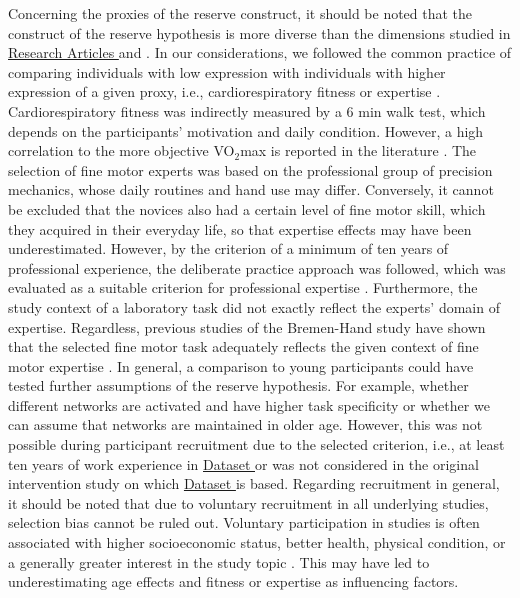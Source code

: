 Concerning the proxies of the reserve construct, it should be noted that the construct of the reserve hypothesis is more diverse than the dimensions studied in \hyperref[results:paperI]{Research Articles } and \hyperref[results:paperI]{}. In our considerations, we followed the common practice of comparing individuals with low expression with individuals with higher expression of a given proxy, i.e., cardiorespiratory fitness or expertise \cite{Koen2019}. Cardiorespiratory fitness was indirectly measured by a 6 min walk test, which depends on the participants' motivation and daily condition. However, a high correlation to the more objective VO$_2$max is reported in the literature \cite{Zhang2017}. The selection of fine motor experts was based on the professional group of precision mechanics, whose daily routines and hand use may differ. Conversely, it cannot be excluded that the novices also had a certain level of fine motor skill, which they acquired in their everyday life, so that expertise effects may have been underestimated. However, by the criterion of a minimum of ten years of professional experience, the deliberate practice approach was followed, which was evaluated as a suitable criterion for professional expertise \cite{Ericsson1991, Voelcker-Rehage2013}. Furthermore, the study context of a laboratory task did not exactly reflect the experts' domain of expertise. Regardless, previous studies of the Bremen-Hand study have shown that the selected fine motor task adequately reflects the given context of fine motor expertise \cite{Vieluf2018, Goelz2018, Vieluf2012, Vieluf2013}. In general, a comparison to young participants could have tested further assumptions of the reserve hypothesis. For example, whether different networks are activated and have higher task specificity or whether we can assume that networks are maintained in older age. However, this was not possible during participant recruitment due to the selected criterion, i.e., at least ten years of work experience in \hyperref[methods:datasets:I]{Dataset } or was not considered in the original intervention study on which \hyperref[methods:datasets:III]{Dataset } is based. Regarding recruitment in general, it should be noted that due to voluntary recruitment in all underlying studies, selection bias cannot be ruled out. Voluntary participation in studies is often associated with higher socioeconomic status, better health, physical condition, or a generally greater interest in the study topic \cite{Ganguli1998, Peters-Davis2001, Dodge2014}. This may have led to underestimating age effects and fitness or expertise as influencing factors.\\
